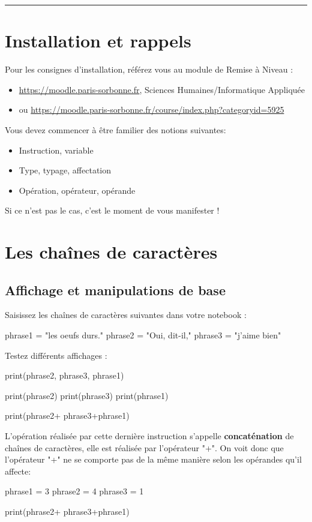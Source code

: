
\newcommand{\numTD}{TD1}
\newcommand{\themeTD}{manipulations de base en \textsc{Python}}



\hrule

\section{Installation et rappels}

 Pour les consignes d'installation, référez vous au module de Remise à Niveau : %
\begin{itemize}
\item \url{https://moodle.paris-sorbonne.fr}, Sciences Humaines/Informatique Appliquée
\item ou \url{https://moodle.paris-sorbonne.fr/course/index.php?categoryid=5925}
\end{itemize}

 Vous devez commencer à être familier des notions suivantes:
\begin{itemize}
\item Instruction, variable
\item Type, typage, affectation
\item Opération, opérateur, opérande

\end{itemize}
Si ce n'est pas le cas, c'est le moment de vous manifester !

\section{Les chaînes de caractères}

\subsection{Affichage et manipulations de base}

 Saisissez les chaînes de caractères suivantes dans votre notebook :

\begin{python}
phrase1 = "les oeufs durs."
phrase2 = "Oui, dit-il,"
phrase3 = "j'aime bien"
\end{python}

Testez différents affichages :
\begin{python}
print(phrase2, phrase3, phrase1)

print(phrase2)
print(phrase3)
print(phrase1)

print(phrase2+ phrase3+phrase1)
\end{python}
 L'opération réalisée par cette dernière instruction s'appelle \textbf{concaténation} de chaînes de caractères, elle est réalisée par l'opérateur "+". 
On voit donc que l'opérateur "+" ne se comporte pas de la même manière selon les opérandes qu'il affecte: 
\begin{python}
phrase1 = 3
phrase2 = 4
phrase3 = 1 

print(phrase2+ phrase3+phrase1)
\end{python}


